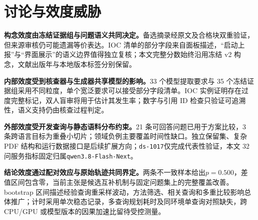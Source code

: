 \section{讨论与效度威胁}

\textbf{构念效度由冻结证据组与问题语义共同决定。}备选摘录经原文及合格块双重验证，但来源审核仍可能遗漏等价表达。IOC 清单的部分字段来自面板描述，“启动上报”与“界面展示”的语义边界值得独立复核；本文完整分数始终沿用冻结 v2 构念，文献出版年与本地版本标签分别保留。

\textbf{内部效度受到核查器与生成器共享模型的影响。}33 个模型提取要求与 35 个冻结证据组采用不同粒度，单个宽泛要求可以接受部分字段清单。IOC 实例证明存在过度完整标记，双人盲审将用于估计其发生率；数字与引用 ID 检查只验证可追溯性，语义支持仍由核查过程判定。

\textbf{外部效度受开发查询与静态语料分布约束。}21 条可回答问题已用于方案比较，3 条跨语言目标为重叠小切片；领域负例主要覆盖时间性缺口。独立保留集、复杂 PDF 结构和运行数据接口是后续扩展方向；\texttt{ds-1017}仅完成代表性验证，本文 32 问服务指标固定归属\texttt{qwen3.8-Flash-Next}。

\textbf{结论效度通过配对效应与原始轨迹共同界定。}两条不一致样本给出\(p=0.500\)，差值区间包含零，当前主张是候选互补机制与固定问题集上的完整覆盖改善。bootstrap 区间描述经验查询重采样波动，方法筛选、相关查询和多重比较影响总体推广；计时采用单次稳态记录，多查询规划耗时及同环境单查询对照缺失，跨 CPU/GPU 或模型版本的因果加速比留待受控测量。
